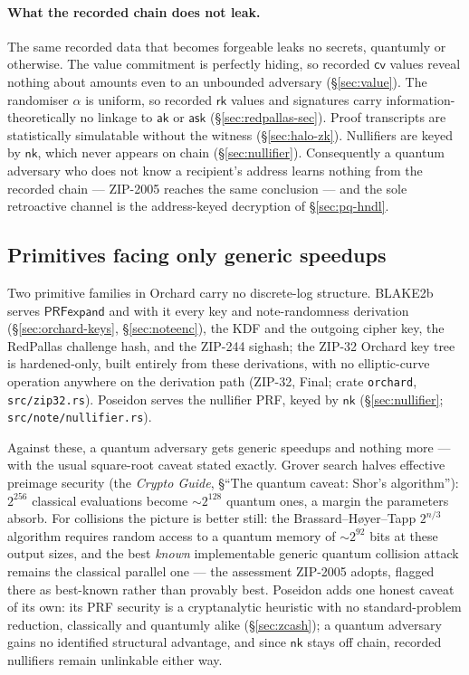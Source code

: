 \documentclass[11pt,a4paper]{article}
\theoremstyle{definition}
\newcommand{\cvsym}{\mathsf{cv}}
\newcommand{\rk}{\mathsf{rk}}
\newcommand{\ask}{\ensuremath{\mathsf{ask}}}
\newcommand{\aksym}{\ensuremath{\mathsf{ak}}}
\newcommand{\nksym}{\ensuremath{\mathsf{nk}}}
\begin{document}
\paragraph{What the recorded chain does not leak.} The same recorded data that
becomes forgeable leaks no secrets, quantumly or otherwise. The value
commitment is perfectly hiding, so recorded $\cvsym$ values reveal nothing
about amounts even to an unbounded adversary (\S\ref{sec:value}). The
randomiser $\alpha$ is uniform, so recorded $\rk$ values and signatures carry
information-theoretically no linkage to $\aksym$ or $\ask$
(\S\ref{sec:redpallas-sec}). Proof transcripts are statistically simulatable
without the witness (\S\ref{sec:halo-zk}). Nullifiers are keyed by $\nksym$,
which never appears on chain (\S\ref{sec:nullifier}). Consequently a quantum
adversary who does not know a recipient's address learns nothing from the
recorded chain --- ZIP-2005 reaches the same conclusion --- and the sole
retroactive channel is the address-keyed decryption of \S\ref{sec:pq-hndl}.

\subsection{Primitives facing only generic speedups}\label{sec:pq-grover}

Two primitive families in Orchard carry no discrete-log structure. BLAKE2b
serves $\mathsf{PRFexpand}$ and with it every key and note-randomness
derivation (\S\ref{sec:orchard-keys}, \S\ref{sec:noteenc}), the KDF and the
outgoing cipher key, the RedPallas challenge hash, and the ZIP-244 sighash;
the ZIP-32 Orchard key tree is hardened-only, built entirely from these
derivations, with no elliptic-curve operation anywhere on the derivation path
(ZIP-32, Final; crate \texttt{orchard}, \texttt{src/zip32.rs}). Poseidon
serves the nullifier PRF, keyed by $\nksym$ (\S\ref{sec:nullifier};
\texttt{src/note/nullifier.rs}).

Against these, a quantum adversary gets generic speedups and nothing more ---
with the usual square-root caveat stated exactly. Grover search halves
effective preimage security (the \emph{Crypto Guide}, \S``The quantum caveat:
Shor's algorithm''): $2^{256}$ classical evaluations become
${\sim}2^{128}$ quantum ones, a margin the parameters absorb. For collisions
the picture is better still: the Brassard--H{\o}yer--Tapp $2^{n/3}$ algorithm
requires random access to a quantum memory of ${\sim}2^{92}$ bits at these
output sizes, and the best \emph{known} implementable generic quantum
collision attack remains the classical parallel one --- the assessment
ZIP-2005 adopts, flagged there as best-known rather than provably best.
Poseidon adds one honest caveat of its own: its PRF security is a
cryptanalytic heuristic with no standard-problem reduction, classically and
quantumly alike (\S\ref{sec:zcash}); a quantum adversary gains no identified
structural advantage, and since $\nksym$ stays off chain, recorded nullifiers
remain unlinkable either way.
\end{document}
